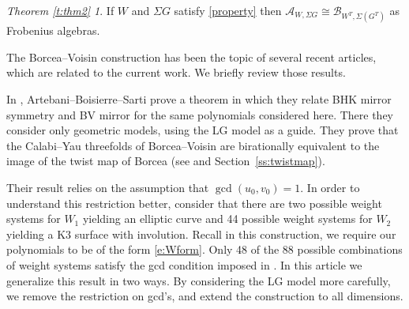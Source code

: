 \documentclass[10pt, letterpaper]{amsart}
\theoremstyle{remark}
\newtheorem*{thm2}{Theorem \ref{t:thm2}}
\newcommand{\sA}{\mathscr{A}}
\newcommand{\sB}{\mathscr{B}}
\newcommand{\s}[1]{\Sigma #1}
\begin{document}
\begin{thm2}
If $W$ and $\s G$ satisfy \autoref{property}
then $\sA_{W, \s{G}} \cong \sB_{W^T, \s (G^T)}$ as Frobenius algebras.
\end{thm2}

The Borcea--Voisin construction has been the topic of several recent articles, which are related to the current work. We briefly review those results.  

In \cite{ABS}, Artebani--Boisierre--Sarti prove a theorem in which they relate BHK mirror symmetry and BV mirror for the same polynomials considered here. There they consider only geometric models, using the LG model as a guide. They prove that the Calabi--Yau threefolds of Borcea--Voisin are birationally equivalent to the image of the twist map of Borcea (see \cite{Borcea} and Section~\ref{ss:twistmap}). 

Their result relies on the assumption that $\gcd(u_0,v_0)=1$. In order to understand this restriction better, consider that there are two possible weight systems for $W_1$ yielding an elliptic curve and 44 possible weight systems for $W_2$ yielding a K3 surface with involution. Recall in this construction, we require our polynomials to be of the form \eqref{e:Wform}. Only 48 of the 88 possible combinations of weight systems satisfy the gcd condition imposed in \cite{ABS}. In this article we generalize this result in two ways. By considering the LG model more carefully, we remove the restriction on gcd's, and extend the construction to all dimensions. 
\end{document}
